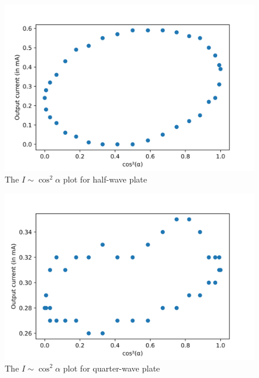 \documentclass{article}
\begin{document}
\begin{figure}
    \centering
    \includegraphics[scale = 0.75]{Figures/cplot-1.png}
    \caption{The $I \sim \cos^2 \alpha$ plot for half-wave plate}
    \label{fig:my_label}
\end{figure}


\begin{figure}
    \centering
    \includegraphics[scale = 0.75]{Figures/cplot-2.png}
    \caption{The $I \sim \cos^2 \alpha$ plot for quarter-wave plate}
    \label{fig:my_label}
\end{figure}
\end{document}
